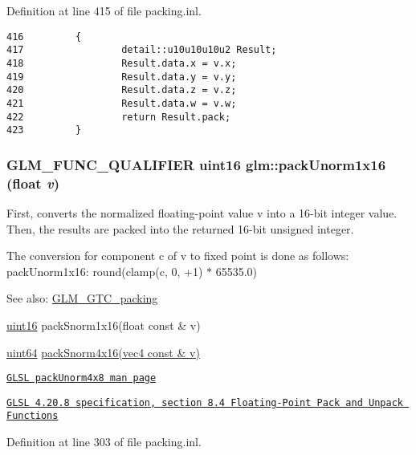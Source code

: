Definition at line 415 of file packing.inl.

\begin{Code}\begin{verbatim}416         {
417                 detail::u10u10u10u2 Result;
418                 Result.data.x = v.x;
419                 Result.data.y = v.y;
420                 Result.data.z = v.z;
421                 Result.data.w = v.w;
422                 return Result.pack; 
423         }
\end{verbatim}
\end{Code}


\hypertarget{group__gtc__packing_g60c7d915f5653559ae02c2f79a8c5c1d}{
\subsubsection[packUnorm1x16]{\setlength{\rightskip}{0pt plus 5cm}GLM\_\-FUNC\_\-QUALIFIER uint16 glm::packUnorm1x16 (float {\em v})}}
\label{group__gtc__packing_g60c7d915f5653559ae02c2f79a8c5c1d}


First, converts the normalized floating-point value v into a 16-bit integer value. Then, the results are packed into the returned 16-bit unsigned integer.

The conversion for component c of v to fixed point is done as follows: packUnorm1x16: round(clamp(c, 0, +1) $\ast$ 65535.0)

\begin{Desc}
\item[See also:]\hyperlink{group__gtc__packing}{GLM\_\-GTC\_\-packing} 

\hyperlink{group__gtc__type__precision_gd8c2939e1fdd8e5828b31d95c52255d5}{uint16} packSnorm1x16(float const \& v) 

\hyperlink{group__gtc__type__precision_ge3632bf9b37da66233d78930dd06378a}{uint64} \hyperlink{group__gtc__packing_g9b237d7c66b7a71964e6d1f4dc06539f}{packSnorm4x16(vec4 const \& v)} 

\href{http://www.opengl.org/sdk/docs/manglsl/xhtml/packUnorm4x8.xml}{\tt GLSL packUnorm4x8 man page} 

\href{http://www.opengl.org/registry/doc/GLSLangSpec.4.20.8.pdf}{\tt GLSL 4.20.8 specification, section 8.4 Floating-Point Pack and Unpack Functions} \end{Desc}


Definition at line 303 of file packing.inl.

